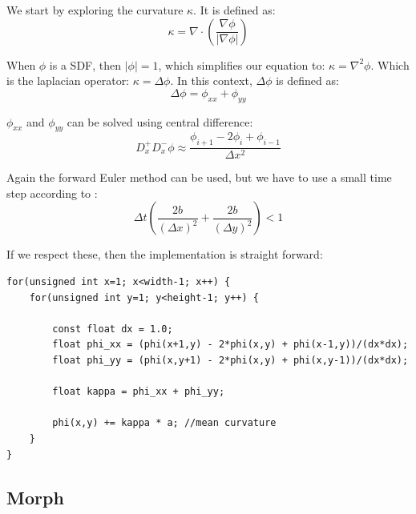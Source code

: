 We start by exploring the curvature $\kappa$. It is defined as:
\begin{equation}
  \kappa = \nabla\cdot\left(\frac{\nabla\phi}{|\nabla\phi|}\right)
\end{equation}

When $\phi$ is a SDF, then $|\phi|=1$, which simplifies our equation
to: $\kappa = \nabla^2\phi$. Which is the laplacian operator: $\kappa =
\Delta\phi$. In this context, $\Delta\phi$ is defined as:
\begin{equation}
  \Delta\phi = \phi_{xx} + \phi_{yy}
\end{equation}

$\phi_{xx}$ and $\phi_{yy}$ can be solved using central difference:
\begin{equation}
  D^+_xD^-_x\phi 
  \approx
  \frac{\phi_{i+1}-2\phi_i+\phi_{i-1}}{\Delta x^2}
\end{equation} %

Again the forward Euler method can be used, but we have to use a small
time step according to :
\begin{equation}
   \Delta t \left(
     \frac{2b}{(\Delta x)^2} +
     \frac{2b}{(\Delta y)^2}
   \right) < 1
\end{equation}

If we respect these, then the  implementation is straight forward:


\begin{lstlisting}
for(unsigned int x=1; x<width-1; x++) {
    for(unsigned int y=1; y<height-1; y++) {

        const float dx = 1.0;
        float phi_xx = (phi(x+1,y) - 2*phi(x,y) + phi(x-1,y))/(dx*dx);
        float phi_yy = (phi(x,y+1) - 2*phi(x,y) + phi(x,y-1))/(dx*dx);

        float kappa = phi_xx + phi_yy;
 
        phi(x,y) += kappa * a; //mean curvature
    }
}
\end{lstlisting}


\subsection{Morph}

